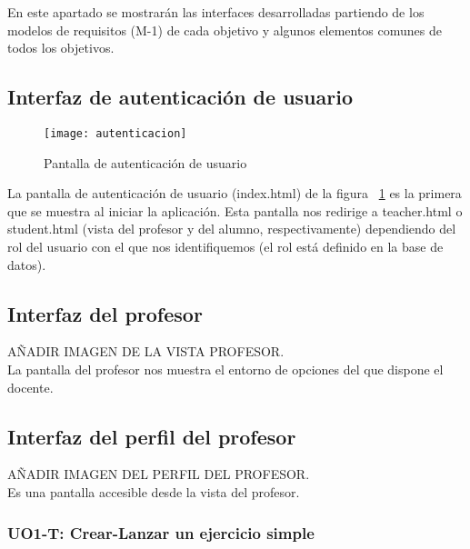 En este apartado se mostrarán las interfaces desarrolladas partiendo de los modelos de requisitos (M-1) de cada objetivo y algunos elementos comunes de todos los objetivos.

\subsection{Interfaz de autenticación de usuario}
\label{diseno-e-implementacion:interfaces:autenticacion}

\begin{figure}[H]
	\centering
	\texttt{[image: autenticacion]}
	\caption{Pantalla de autenticación de usuario}
	\label{fig:autenticacion}
\end{figure}

La pantalla de autenticación de usuario (index.html) de la figura ~\ref{fig:autenticacion} es la primera que se muestra al iniciar la aplicación. Esta pantalla nos redirige a teacher.html o student.html (vista del profesor y del alumno, respectivamente) dependiendo del rol del usuario con el que nos identifiquemos (el rol está definido en la base de datos).\\

\subsection{Interfaz del profesor}
\label{diseno-e-implementacion:interfaces:profesor}

AÑADIR IMAGEN DE LA VISTA PROFESOR.\\

La pantalla del profesor nos muestra el entorno de opciones del que dispone el docente.\\

\subsection{Interfaz del perfil del profesor}
\label{diseno-e-implementacion:interfaces:perfil}

AÑADIR IMAGEN DEL PERFIL DEL PROFESOR.\\

Es una pantalla accesible desde la vista del profesor.

\subsubsection{UO1-T: Crear-Lanzar un ejercicio simple}
\label{diseno-e-implementacion:interfaces:profesor:uo1-t}

